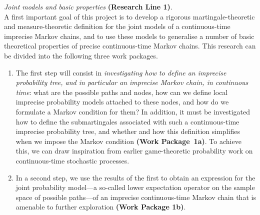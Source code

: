 \documentclass[11pt,dvipsnames,usenames,a4paper]{article}
\begin{document}
\emph{Joint models and basic properties} {\bf (Research Line 1)}.\\[3pt]
A first important goal of this project is to develop a rigorous martingale-theoretic and measure-theoretic definition for the joint models of a continuous-time imprecise Markov chains, and to use these models to generalise a number of basic theoretical properties of precise continuous-time Markov chains. 
This research can be divided into the following three work packages.
\begin{enumerate}[label=\tiny$\blacksquare$,leftmargin=*,noitemsep]
\item The first step will consist in \emph{investigating how to define an imprecise probability tree, and in particular an imprecise Markov chain, in continuous time}: what are the possible paths and nodes, how can we define local imprecise probability models attached to these nodes, and how do we formulate a Markov condition for them?
In addition, it must be investigated how to define the submartingales associated with such a continuous-time imprecise probability tree, and whether and how this definition simplifies when we impose the Markov condition {\bf(Work Package~1a)}.
To achieve this, we can draw inspiration from earlier game-theoretic probability work on continuous-time stochastic processes\cite{vovk1993:forecasting,vovk2016:richquick}. 
\item In a second step, we use the results of the first to obtain an expression for the joint probability model---a so-called lower expectation operator on the sample space of possible paths---of an imprecise continuous-time Markov chain that is amenable to further exploration {\bf(Work Package 1b)}.

\end{enumerate}
\end{document}
